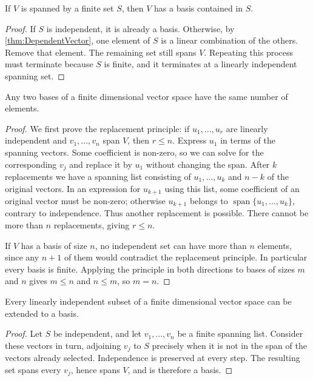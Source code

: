 \begin{Theorem}\label{thm:FiniteSpanningBasis}
If $V$ is spanned by a finite set $S$, then $V$ has a basis contained in $S$.
\end{Theorem}
\begin{proof}
If $S$ is independent, it is already a basis. Otherwise, by \cref{thm:DependentVector}, one element of $S$ is a linear combination of the others. Remove that element. The remaining set still spans $V$. Repeating this process must terminate because $S$ is finite, and it terminates at a linearly independent spanning set.
\end{proof}

\begin{Theorem}\label{thm:BasisCardinality}
Any two bases of a finite dimensional vector space have the same number of elements.
\end{Theorem}
\begin{proof}
We first prove the replacement principle: if $u_1,\ldots,u_r$ are linearly independent and $v_1,\ldots,v_n$ span $V$, then $r\le n$. Express $u_1$ in terms of the spanning vectors. Some coefficient is non-zero, so we can solve for the corresponding $v_j$ and replace it by $u_1$ without changing the span. After $k$ replacements we have a spanning list consisting of $u_1,\ldots,u_k$ and $n-k$ of the original vectors. In an expression for $u_{k+1}$ using this list, some coefficient of an original vector must be non-zero; otherwise $u_{k+1}$ belongs to $\operatorname{span}\{u_1,\ldots,u_k\}$, contrary to independence. Thus another replacement is possible. There cannot be more than $n$ replacements, giving $r\le n$.

If $V$ has a basis of size $n$, no independent set can have more than $n$ elements, since any $n+1$ of them would contradict the replacement principle. In particular every basis is finite. Applying the principle in both directions to bases of sizes $m$ and $n$ gives $m\le n$ and $n\le m$, so $m=n$.
\end{proof}

\begin{Theorem}\label{thm:BasisExtension}
Every linearly independent subset of a finite dimensional vector space can be extended to a basis.
\end{Theorem}
\begin{proof}
Let $S$ be independent, and let $v_1,\ldots,v_n$ be a finite spanning list. Consider these vectors in turn, adjoining $v_j$ to $S$ precisely when it is not in the span of the vectors already selected. Independence is preserved at every step. The resulting set spans every $v_j$, hence spans $V$, and is therefore a basis.
\end{proof}

